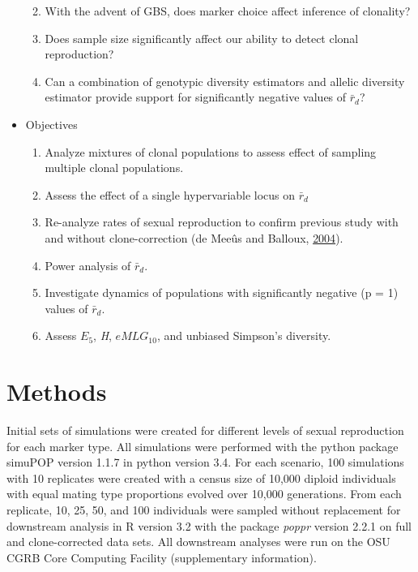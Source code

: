 \documentclass[double,12pt]{beavtex}
\providecommand{\tightlist}{%
  \setlength{\itemsep}{0pt}\setlength{\parskip}{0pt}}
\begin{document}
\begin{itemize}
    \begin{enumerate}
    \def\labelenumi{\arabic{enumi}.}
    \tightlist
    \item
      With the advent of GBS, does marker choice affect inference of
      clonality?
    \item
      Does sample size significantly affect our ability to detect clonal
      reproduction?
    \item
      Can a combination of genotypic diversity estimators and allelic
      diversity estimator provide support for significantly negative
      values of \(\bar{r}_d\)?
    \end{enumerate}
  \item
    Objectives
  
    \begin{enumerate}
    \def\labelenumi{\arabic{enumi}.}
    \tightlist
    \item
      Analyze mixtures of clonal populations to assess effect of sampling
      multiple clonal populations.
    \item
      Assess the effect of a single hypervariable locus on \(\bar{r}_d\)
    \item
      Re-analyze rates of sexual reproduction to confirm previous study
      with and without clone-correction (de Meeûs and Balloux,
      \protect\hyperlink{ref-de2004clonal}{2004}).
    \item
      Power analysis of \(\bar{r}_d\).
    \item
      Investigate dynamics of populations with significantly negative (p =
      1) values of \(\bar{r}_d\).
    \item
      Assess \(E_5\), \emph{H}, \(eMLG_{10}\), and unbiased Simpson's
      diversity.
    \end{enumerate}
  \end{itemize}
  
  \section{Methods}\label{methods}
  
  Initial sets of simulations were created for different levels of sexual
  reproduction for each marker type. All simulations were performed with
  the python package simuPOP version 1.1.7 in python version 3.4. For each
  scenario, 100 simulations with 10 replicates were created with a census
  size of 10,000 diploid individuals with equal mating type proportions
  evolved over 10,000 generations. From each replicate, 10, 25, 50, and
  100 individuals were sampled without replacement for downstream analysis
  in R version 3.2 with the package \emph{poppr} version 2.2.1 on full and
  clone-corrected data sets. All downstream analyses were run on the OSU
  CGRB Core Computing Facility (supplementary information).
  
\end{document}
